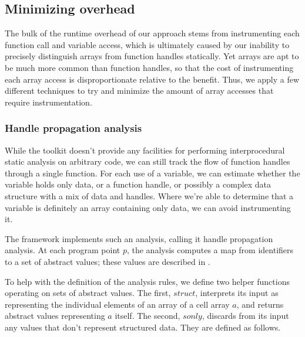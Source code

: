 \subsection{Minimizing overhead}

The bulk of the runtime overhead of our approach stems from instrumenting each
function call and variable access, which is ultimately caused by our inability
to precisely distinguish arrays from function handles statically. Yet arrays
are apt to be much more common than function handles, so that the cost of
instrumenting each array access is disproportionate relative to the benefit.
Thus, we apply a few different techniques to try and minimize the amount of
array accesses that require instrumentation.

\subsubsection{Handle propagation analysis}

While the \mclab toolkit doesn't provide any facilities for performing
interprocedural static analysis on arbitrary \matlab code, we can still track
the flow of function handles through a single function. For each use of a
variable, we can estimate whether the variable holds only data, or a function
handle, or possibly a complex data structure with a mix of data and handles.
Where we're able to determine that a variable is definitely an array containing
only data, we can avoid instrumenting it.

The \mclab framework implements such an analysis, calling it handle propagation
analysis. At each program point $p$, the analysis computes a map from
identifiers to a set of abstract values; these values are described in
.

To help with the definition of the analysis rules, we define two helper
functions operating on sets of abstract values. The first, $struct$, interprets
its input as representing the individual elements of an array of a cell array
$a$, and returns abstract values representing $a$ itself. The second, $sonly$,
discards from its input any values that don't represent structured data. They
are defined as follows.


